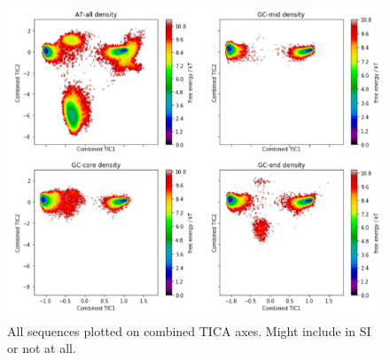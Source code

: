 \documentclass[journal=jpcbfk,manuscript=article]{achemso}
\begin{document}
\begin{figure}[ht!]
	\begin{center}
        \includegraphics[width=\textwidth]{Figs/figs_0804/all_seq_tica_cvs.PNG}
        \caption{All sequences plotted on combined TICA axes. Might include in SI or not at all.}
        \label{fig:all_seq_tica_cvs}
	\end{center}
\end{figure}
\end{document}

